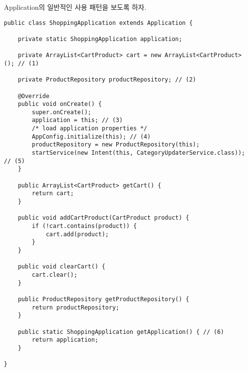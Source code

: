 Application의 일반적인 사용 패턴을 보도록 하자.
\newpage
\begin{lstlisting}[frame=single, caption=Application 샘플, label=application] 
public class ShoppingApplication extends Application {

	private static ShoppingApplication application;
	
	private ArrayList<CartProduct> cart = new ArrayList<CartProduct>(); // (1)
	
	private ProductRepository productRepository; // (2)
	
	@Override
	public void onCreate() {
		super.onCreate();
		application = this; // (3)
		/* load application properties */
		AppConfig.initialize(this); // (4)
		productRepository = new ProductRepository(this);
		startService(new Intent(this, CategoryUpdaterService.class)); // (5)
	}
	
	public ArrayList<CartProduct> getCart() {
		return cart;
	}
	
	public void addCartProduct(CartProduct product) {
		if (!cart.contains(product)) {
			cart.add(product);
		}
	}
	
	public void clearCart() {
		cart.clear();
	}
	
	public ProductRepository getProductRepository() {
		return productRepository;
	}
	
	public static ShoppingApplication getApplication() { // (6)
		return application;
	}
	
}
\end{lstlisting}
